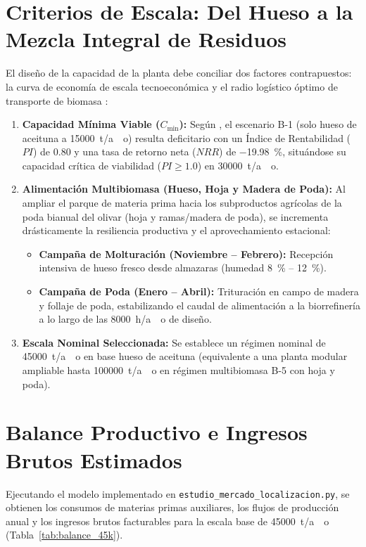 \documentclass{report}
\begin{document}
\section{Criterios de Escala: Del Hueso a la Mezcla Integral de Residuos}
El diseño de la capacidad de la planta debe conciliar dos factores contrapuestos: la curva de economía de escala tecnoeconómica y el radio logístico óptimo de transporte de biomasa \autocite{Jafari-Gohargan2026}:
\begin{enumerate}
    \item \textbf{Capacidad Mínima Viable ($C_{\text{min}}$):} Según \textcite{Jafari-Gohargan2026}, el escenario B-1 (solo hueso de aceituna a \SI{15000}{\tonne/ao}) resulta deficitario con un Índice de Rentabilidad ($PI$) de \num{0.80} y una tasa de retorno neta ($NRR$) de \SI{-19.98}{\percent}, situándose su capacidad crítica de viabilidad ($PI \ge 1.0$) en \SI{30000}{\tonne/ao}.
    \item \textbf{Alimentación Multibiomasa (Hueso, Hoja y Madera de Poda):} Al ampliar el parque de materia prima hacia los subproductos agrícolas de la poda bianual del olivar (hoja y ramas/madera de poda), se incrementa drásticamente la resiliencia productiva y el aprovechamiento estacional:
          \begin{itemize}
              \item \textbf{Campaña de Molturación (Noviembre -- Febrero):} Recepción intensiva de hueso fresco desde almazaras (humedad \SI{8}{\percent} -- \SI{12}{\percent}).
              \item \textbf{Campaña de Poda (Enero -- Abril):} Trituración en campo de madera y follaje de poda, estabilizando el caudal de alimentación a la biorrefinería a lo largo de las \SI{8000}{\hour/ao} de diseño.
          \end{itemize}
    \item \textbf{Escala Nominal Seleccionada:} Se establece un régimen nominal de \SI{45000}{\tonne/ao} en base hueso de aceituna (equivalente a una planta modular ampliable hasta \SI{100000}{\tonne/ao} en régimen multibiomasa B-5 con hoja y poda).
\end{enumerate}

\section{Balance Productivo e Ingresos Brutos Estimados}
Ejecutando el modelo implementado en \texttt{estudio\_mercado\_localizacion.py}, se obtienen los consumos de materias primas auxiliares, los flujos de producción anual y los ingresos brutos facturables para la escala base de \SI{45000}{\tonne/ao} (Tabla~\ref{tab:balance_45k}).
\end{document}
